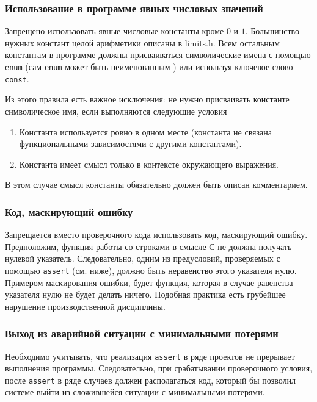 {{{\subsubsection{Использование в программе явных числовых значений}

Запрещено использовать явные числовые константы кроме $0$ и $1$. Большинство нужных констант целой арифметики описаны в limits.h. Всем остальным константам в программе должны присваиваться символические имена с помощью \lstinline|enum| (сам \lstinline|enum| может быть неименованным ) или используя ключевое слово \lstinline|const|.

Из этого правила есть важное исключения: не нужно присваивать константе символическое имя, если выполняются следующие условия

\begin{enumerate}
\item Константа используется ровно в одном месте (константа не связана функциональными зависимостями с другими константами).
\item Константа имеет смысл только в контексте окружающего выражения.
\end{enumerate}

В этом случае смысл константы обязательно должен быть описан комментарием.

\subsubsection{Код, маскирующий ошибку}

Запрещается вместо проверочного кода использовать код, маскирующий ошибку. Предположим, функция работы со строками в смысле С не должна получать нулевой указатель. Следовательно, одним из предусловий, проверяемых с помощью \lstinline|assert| (см. ниже), должно быть неравенство этого указателя нулю. Примером маскирования ошибки, будет функция, которая в случае равенства указателя нулю не будет делать ничего. Подобная практика есть грубейшее нарушение производственной дисциплины.

\subsubsection{Выход из аварийной ситуации с минимальными потерями}

Необходимо учитывать, что реализация \lstinline|assert| в ряде проектов не прерывает выполнения программы. Следовательно, при срабатывании проверочного условия, после \lstinline|assert| в ряде случаев должен располагаться код, который бы позволил системе выйти из сложившейся ситуации с минимальными потерями. 

}}}
